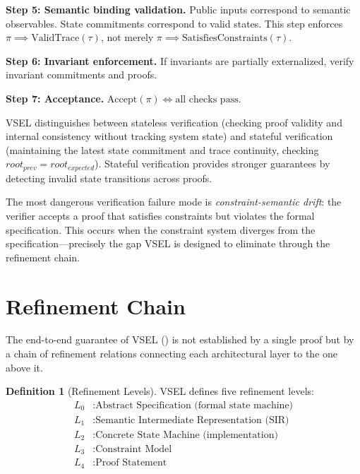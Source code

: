 \documentclass[11pt,a4paper]{article}
\theoremstyle{definition}
\newtheorem{definition}{Definition}[section]
\newcommand{\ValidTrace}{\mathrm{ValidTrace}}
\newcommand{\SatisfiesConstraints}{\mathrm{SatisfiesConstraints}}
\begin{document}
\noindent\textbf{Step 5: Semantic binding validation.} Public inputs correspond to semantic observables. State commitments correspond to valid states. This step enforces $\pi \implies \ValidTrace(\tau)$, not merely $\pi \implies \SatisfiesConstraints(\tau)$.

\noindent\textbf{Step 6: Invariant enforcement.} If invariants are partially externalized, verify invariant commitments and proofs.

\noindent\textbf{Step 7: Acceptance.} $\mathrm{Accept}(\pi) \iff \text{all checks pass}$.

VSEL distinguishes between stateless verification (checking proof validity and internal consistency without tracking system state) and stateful verification (maintaining the latest state commitment and trace continuity, checking $\mathit{root}_{\mathit{prev}} = \mathit{root}_{\mathit{expected}}$). Stateful verification provides stronger guarantees by detecting invalid state transitions across proofs.

The most dangerous verification failure mode is \emph{constraint-semantic drift}: the verifier accepts a proof that satisfies constraints but violates the formal specification. This occurs when the constraint system diverges from the specification---precisely the gap VSEL is designed to eliminate through the refinement chain.

\section{Refinement Chain}
\label{sec:refinement}

The end-to-end guarantee of VSEL () is not established by a single proof but by a chain of refinement relations connecting each architectural layer to the one above it.

\begin{definition}[Refinement Levels]
\label{def:refinement-levels}
VSEL defines five refinement levels:
\begin{align}
L_0 &: \text{Abstract Specification (formal state machine)} \\
L_1 &: \text{Semantic Intermediate Representation (SIR)} \\
L_2 &: \text{Concrete State Machine (implementation)} \\
L_3 &: \text{Constraint Model} \\
L_4 &: \text{Proof Statement}
\end{align}
\end{definition}
\end{document}
